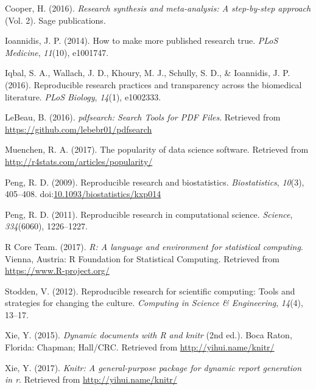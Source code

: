 \documentclass[english,floatsintext,man]{apa6}
\theoremstyle{definition}
\theoremstyle{definition}
\theoremstyle{remark}
\begin{document}
\hypertarget{ref-cooper2016}{}
Cooper, H. (2016). \emph{Research synthesis and meta-analysis: A
step-by-step approach} (Vol. 2). Sage publications.

\hypertarget{ref-ioannidis2014}{}
Ioannidis, J. P. (2014). How to make more published research true.
\emph{PLoS Medicine}, \emph{11}(10), e1001747.

\hypertarget{ref-iqbal2016}{}
Iqbal, S. A., Wallach, J. D., Khoury, M. J., Schully, S. D., \&
Ioannidis, J. P. (2016). Reproducible research practices and
transparency across the biomedical literature. \emph{PLoS Biology},
\emph{14}(1), e1002333.

\hypertarget{ref-pdfsearch}{}
LeBeau, B. (2016). \emph{pdfsearch: Search Tools for PDF Files}.
Retrieved from \url{https://github.com/lebebr01/pdfsearch}

\hypertarget{ref-muenchen}{}
Muenchen, R. A. (2017). The popularity of data science software.
Retrieved from \url{http://r4stats.com/articles/popularity/}

\hypertarget{ref-peng2009}{}
Peng, R. D. (2009). Reproducible research and biostatistics.
\emph{Biostatistics}, \emph{10}(3), 405--408.
doi:\href{https://doi.org/10.1093/biostatistics/kxp014}{10.1093/biostatistics/kxp014}

\hypertarget{ref-peng2011}{}
Peng, R. D. (2011). Reproducible research in computational science.
\emph{Science}, \emph{334}(6060), 1226--1227.

\hypertarget{ref-rpro}{}
R Core Team. (2017). \emph{R: A language and environment for statistical
computing}. Vienna, Austria: R Foundation for Statistical Computing.
Retrieved from \url{https://www.R-project.org/}

\hypertarget{ref-stodden2012}{}
Stodden, V. (2012). Reproducible research for scientific computing:
Tools and strategies for changing the culture. \emph{Computing in
Science \& Engineering}, \emph{14}(4), 13--17.

\hypertarget{ref-knitr}{}
Xie, Y. (2015). \emph{Dynamic documents with R and knitr} (2nd ed.).
Boca Raton, Florida: Chapman; Hall/CRC. Retrieved from
\url{http://yihui.name/knitr/}

\hypertarget{ref-knitrmanual}{}
Xie, Y. (2017). \emph{Knitr: A general-purpose package for dynamic
report generation in r}. Retrieved from \url{http://yihui.name/knitr/}
\end{document}
